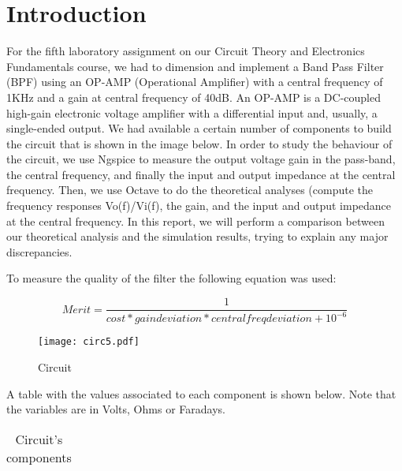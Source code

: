 \section{Introduction}

For the fifth laboratory assignment on our Circuit Theory and Electronics Fundamentals course, we had to dimension and implement a Band Pass Filter (BPF) using an OP-AMP (Operational Amplifier) with a central frequency of 1KHz and a gain at central frequency of 40dB. An OP-AMP  is a DC-coupled high-gain electronic voltage amplifier with a differential input and, usually, a single-ended output. We had available a certain number of components to build the circuit that is shown in the image below. In order to study the behaviour of the circuit, we use Ngspice to measure the output voltage gain in the pass-band, the central frequency, and finally the input and output impedance at the central frequency. Then, we use Octave to do the theoretical analyses (compute the frequency responses Vo(f)/Vi(f), the gain, and the input and output impedance at the central frequency. In this report, we will perform a comparison between our theoretical analysis and the simulation results, trying to explain any major discrepancies.
\par

To measure the quality of the filter the following equation was used:

\begin{equation}
    Merit=\frac{1}{cost*gaindeviation*centralfreqdeviation + 10^{-6}}
\end{equation}

\par

\begin{figure}[ht] \centering
\texttt{[image: circ5.pdf]}
\caption{Circuit}
\label{fig:circ}
\end{figure}
\par
A table with the values associated to each component is shown below. Note that the variables are in Volts, Ohms or Faradays.
\par
\begin{table}[H]
\centering
\begin{tabularx}{0.6\textwidth} {
  | >{\raggedright\arraybackslash}X
  | >{\raggedleft\arraybackslash}X | }
 \hline

\end{tabularx}
\caption{Circuit's components}
\end{table}
\clearpage
